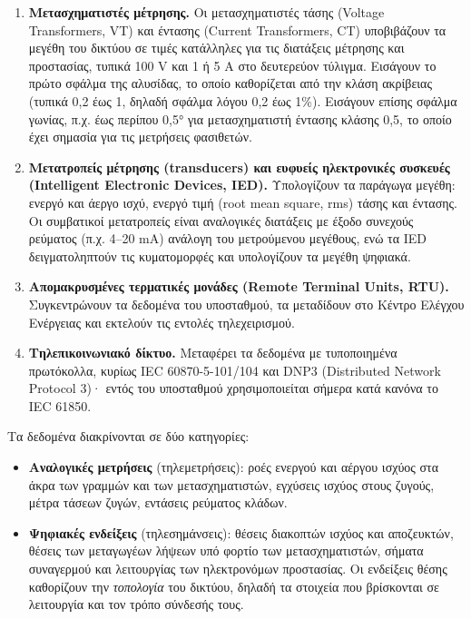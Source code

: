 \begin{enumerate}
\item \textbf{Μετασχηματιστές μέτρησης.} Οι μετασχηματιστές τάσης (Voltage Transformers, VT) και
      έντασης (Current Transformers, CT)
      υποβιβάζουν τα μεγέθη του δικτύου σε τιμές κατάλληλες για τις διατάξεις μέτρησης
      και προστασίας, τυπικά 100 V και 1 ή 5 A στο δευτερεύον τύλιγμα. Εισάγουν το πρώτο
      σφάλμα της αλυσίδας, το οποίο καθορίζεται από την κλάση ακρίβειας (τυπικά 0,2 έως 1,
      δηλαδή σφάλμα λόγου 0,2 έως 1\%). Εισάγουν επίσης σφάλμα γωνίας, π.χ. έως περίπου 0,5°
      για μετασχηματιστή έντασης κλάσης 0,5, το οποίο έχει σημασία για τις μετρήσεις
      φασιθετών.
\item \textbf{Μετατροπείς μέτρησης (transducers) και ευφυείς ηλεκτρονικές συσκευές (Intelligent
      Electronic Devices, IED).}
      Υπολογίζουν τα παράγωγα μεγέθη: ενεργό και άεργο ισχύ, ενεργό τιμή (root mean
      square, rms) τάσης και έντασης. Οι συμβατικοί μετατροπείς είναι αναλογικές διατάξεις με
      έξοδο συνεχούς ρεύματος (π.χ. 4--20 mA) ανάλογη του μετρούμενου μεγέθους, ενώ τα IED
      δειγματοληπτούν τις κυματομορφές και υπολογίζουν τα μεγέθη ψηφιακά.
\item \textbf{Απομακρυσμένες τερματικές μονάδες (Remote Terminal Units, RTU).} Συγκεντρώνουν τα δεδομένα του
      υποσταθμού, τα μεταδίδουν στο Κέντρο Ελέγχου Ενέργειας και εκτελούν τις εντολές
      τηλεχειρισμού.
\item \textbf{Τηλεπικοινωνιακό δίκτυο.} Μεταφέρει τα δεδομένα με τυποποιημένα πρωτόκολλα,
      κυρίως IEC 60870-5-101/104 και DNP3 (Distributed Network Protocol 3)· εντός του υποσταθμού χρησιμοποιείται σήμερα
      κατά κανόνα το IEC 61850.
\end{enumerate}

Τα δεδομένα διακρίνονται σε δύο κατηγορίες:

\begin{itemize}
\item \textbf{Αναλογικές μετρήσεις} (τηλεμετρήσεις): ροές ενεργού και αέργου ισχύος στα
      άκρα των γραμμών και των μετασχηματιστών, εγχύσεις ισχύος στους ζυγούς, μέτρα τάσεων
      ζυγών, εντάσεις ρεύματος κλάδων.
\item \textbf{Ψηφιακές ενδείξεις} (τηλεσημάνσεις): θέσεις διακοπτών ισχύος και αποζευκτών,
      θέσεις των μεταγωγέων λήψεων υπό φορτίο των μετασχηματιστών, σήματα συναγερμού και
      λειτουργίας των ηλεκτρονόμων προστασίας. Οι ενδείξεις θέσης καθορίζουν την
      \emph{τοπολογία} του δικτύου, δηλαδή τα στοιχεία που βρίσκονται σε λειτουργία και τον
      τρόπο σύνδεσής τους.
\end{itemize}

